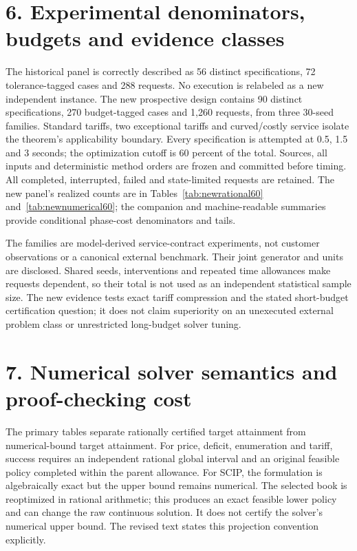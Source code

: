 \documentclass[11pt,letterpaper]{article}
\theoremstyle{definition}\newtheorem{remark}[theorem]{Remark}
\begin{document}
\section*{6. Experimental denominators, budgets and evidence classes}
The historical panel is correctly described as 56 distinct specifications, 72 tolerance-tagged cases and 288 requests. No execution is relabeled as a new independent instance. The new prospective design contains 90 distinct specifications, 270 budget-tagged cases and 1,260 requests, from three 30-seed families. Standard tariffs, two exceptional tariffs and curved/costly service isolate the theorem's applicability boundary. Every specification is attempted at 0.5, 1.5 and 3 seconds; the optimization cutoff is 60 percent of the total. Sources, all inputs and deterministic method orders are frozen and committed before timing. All completed, interrupted, failed and state-limited requests are retained. The new panel's realized counts are in Tables~\ref{tab:newrational60} and~\ref{tab:newnumerical60}; the companion and machine-readable summaries provide conditional phase-cost denominators and tails.

The families are model-derived service-contract experiments, not customer observations or a canonical external benchmark. Their joint generator and units are disclosed. Shared seeds, interventions and repeated time allowances make requests dependent, so their total is not used as an independent statistical sample size. The new evidence tests exact tariff compression and the stated short-budget certification question; it does not claim superiority on an unexecuted external problem class or unrestricted long-budget solver tuning.

\section*{7. Numerical solver semantics and proof-checking cost}
The primary tables separate rationally certified target attainment from numerical-bound target attainment. For price, deficit, enumeration and tariff, success requires an independent rational global interval and an original feasible policy completed within the parent allowance. For SCIP, the formulation is algebraically exact but the upper bound remains numerical. The selected book is reoptimized in rational arithmetic; this produces an exact feasible lower policy and can change the raw continuous solution. It does not certify the solver's numerical upper bound. The revised text states this projection convention explicitly.
\end{document}
